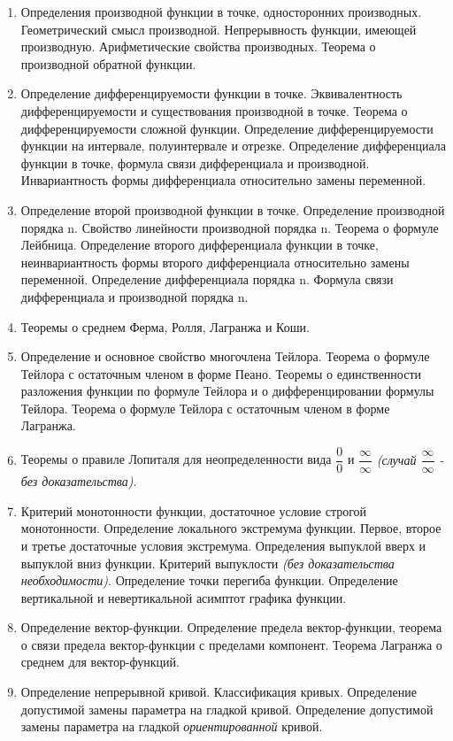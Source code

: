 \documentclass[a4paper,12pt]{article}
\begin{document}
\begin{enumerate}

	\item Определения производной функции в точке, односторонних производных. Геометрический смысл производной. Непрерывность функции, имеющей производную. Арифметические свойства производных. Теорема о производной обратной функции.
	\item Определение дифференцируемости функции в точке. Эквивалентность дифференцируемости и существования производной в точке. Теорема о дифференцируемости сложной функции. Определение дифференцируемости функции на интервале, полуинтервале и отрезке. Определение дифференциала функции в точке, формула связи дифференциала и производной. Инвариантность формы дифференциала относительно замены переменной.
	\item Определение второй производной функции в точке. Определение производной порядка n. Свойство линейности производной порядка n. Теорема о формуле Лейбница. Определение второго дифференциала функции в точке, неинвариантность формы второго дифференциала относительно замены переменной. Определение дифференциала порядка n. Формула связи дифференциала и производной порядка n.
	\item Теоремы о среднем Ферма, Ролля, Лагранжа и Коши.
	\item Определение и основное свойство многочлена Тейлора. Теорема о формуле Тейлора с остаточным членом в форме Пеано. Теоремы о единственности разложения функции по формуле Тейлора и о дифференцировании формулы Тейлора. Теорема о формуле Тейлора с остаточным членом в форме Лагранжа.     
	\item Теоремы о правиле Лопиталя для неопределенности вида $\dfrac{0}{0}$ и $\dfrac{\infty}{\infty}$ \textit{(случай $\dfrac{\infty}{\infty}$ - без доказательства)}.
	\item Критерий монотонности функции, достаточное условие строгой монотонности. Определение локального экстремума функции. Первое, второе и третье достаточные условия экстремума. Определения выпуклой вверх и выпуклой вниз функции. Критерий выпуклости \textit{(без доказательства необходимости)}. Определение точки перегиба функции. Определение вертикальной и невертикальной асимптот графика функции.
	\item Определение вектор-функции. Определение предела вектор-функции, теорема о связи предела вектор-функции с пределами компонент. Теорема Лагранжа о среднем для вектор-функций.
	\item Определение непрерывной кривой. Классификация кривых. Определение допустимой замены параметра на гладкой кривой. Определение допустимой замены параметра на гладкой \textit{ориентированной} кривой. 

\end{enumerate}
\end{document}
